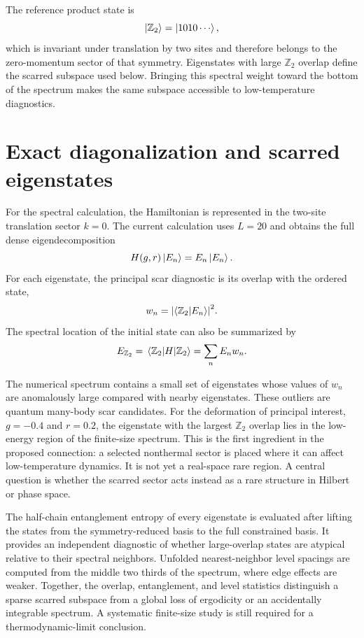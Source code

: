 \documentclass[11pt]{article}
\newcommand{\Ztwo}{\mathbb{Z}_2}
\begin{document}
The reference product state is
\begin{equation}
  \ket{\Ztwo}=\ket{1010\cdots},
\end{equation}
which is invariant under translation by two sites and therefore belongs to the
zero-momentum sector of that symmetry. Eigenstates with large $\Ztwo$ overlap define
the scarred subspace used below. Bringing this spectral weight toward the bottom of
the spectrum makes the same subspace accessible to low-temperature diagnostics.

\section{Exact diagonalization and scarred eigenstates}

For the spectral calculation, the Hamiltonian is represented in the two-site
translation sector $k=0$. The current calculation uses $L=20$ and obtains the full
dense eigendecomposition
\begin{equation}
  H(g,r)\ket{E_n}=E_n\ket{E_n}.
\end{equation}
For each eigenstate, the principal scar diagnostic is its overlap with the ordered
state,
\begin{equation}
  w_n=\abs{\braket{\Ztwo}{E_n}}^2.
  \label{eq:overlap}
\end{equation}
The spectral location of the initial state can also be summarized by
\begin{equation}
  E_{\Ztwo}=\mel{\Ztwo}{H}{\Ztwo}
  =\sum_n E_n w_n.
\end{equation}

The numerical spectrum contains a small set of eigenstates whose values of $w_n$ are
anomalously large compared with nearby eigenstates. These outliers are quantum
many-body scar candidates. For the deformation of principal interest, $g=-0.4$ and
$r=0.2$, the eigenstate with the largest $\Ztwo$ overlap lies in the low-energy
region of the finite-size spectrum. This is the first ingredient in the proposed 
connection: a selected nonthermal sector is placed where it can affect
low-temperature dynamics. It is not yet a real-space rare region. A central question
is whether the scarred sector acts instead as a rare structure in Hilbert or phase
space.

The half-chain entanglement entropy of every eigenstate is evaluated after lifting the
states from the symmetry-reduced basis to the full constrained basis. It provides an
independent diagnostic of whether large-overlap states are atypical relative to their
spectral neighbors. Unfolded nearest-neighbor level spacings are computed from the
middle two thirds of the spectrum, where edge effects are weaker. Together, the
overlap, entanglement, and level statistics distinguish a sparse scarred subspace from
a global loss of ergodicity or an accidentally integrable spectrum. A systematic
finite-size study is still required for a thermodynamic-limit conclusion.
\end{document}
